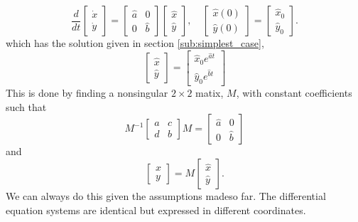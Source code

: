 \documentclass{book}
\begin{document}
\begin{equation*}
\frac{d}{dt}
\begin{bmatrix}
\dot{x}\\
\dot{y}
\end{bmatrix}
= \begin{bmatrix}
\hat{a} & 0\\
0 & \hat{b}
\end{bmatrix}
\begin{bmatrix}
\hat{x}\\
\hat{y}
\end{bmatrix},
\quad
\begin{bmatrix}
\hat{x}(0)\\
\hat{y}(0)
\end{bmatrix}
= \begin{bmatrix}
\hat{x}_{0}\\
\hat{y}_{0}
\end{bmatrix}.
\end{equation*}
which has the solution given in section \ref{sub:simplest_case},
\begin{equation*}
\begin{bmatrix}
\hat{x}\\
\hat{y}
\end{bmatrix}
= \begin{bmatrix}
\hat{x}_{0}e^{\hat{a}t}\\
\hat{y}_{0}e^{\hat{b}t}
\end{bmatrix}
\end{equation*}
This is done by finding a nonsingular $2\times 2$ matix, $M$, with constant coefficients such that
\begin{equation*}
M^{-1}\begin{bmatrix}
a & c\\
d & b
\end{bmatrix} M
= \begin{bmatrix}
\hat{a} & 0\\
0 & \hat{b}
\end{bmatrix}
\end{equation*}
and
\begin{equation*}
\begin{bmatrix}
x\\
y
\end{bmatrix}
= M \begin{bmatrix}
\hat{x}\\
\hat{y}
\end{bmatrix}.
\end{equation*}
We can always do this given the assumptions madeso far. The differential equation systems are
identical but expressed in different coordinates.

\end{document}
